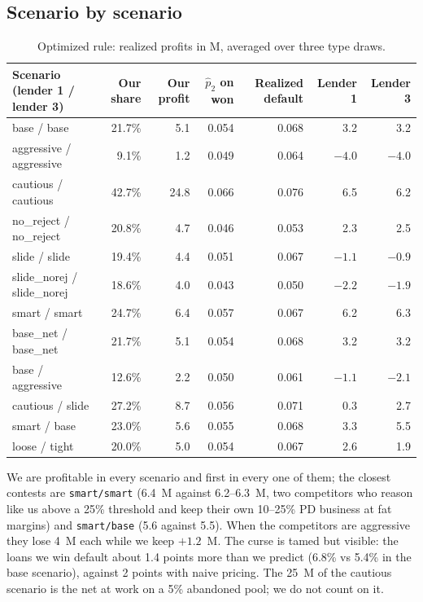 \documentclass[11pt,a4paper]{article}
\newcommand{\meur}{M\texteuro}
\newcommand{\code}[1]{\texttt{#1}}
\begin{document}
\subsection{Scenario by scenario}
\begin{table}[h]\centering\footnotesize
\begin{tabular}{lrrrrrr}
\toprule
Scenario (lender 1 / lender 3) & Our share & Our profit & $\hat p_2$ on won & Realized default & Lender 1 & Lender 3\\
\midrule
base / base                 & 21.7\% &  5.1 & 0.054 & 0.068 &  3.2 &  3.2\\
aggressive / aggressive     &  9.1\% &  1.2 & 0.049 & 0.064 & $-4.0$ & $-4.0$\\
cautious / cautious         & 42.7\% & 24.8 & 0.066 & 0.076 &  6.5 &  6.2\\
no\_reject / no\_reject     & 20.8\% &  4.7 & 0.046 & 0.053 &  2.3 &  2.5\\
slide / slide               & 19.4\% &  4.4 & 0.051 & 0.067 & $-1.1$ & $-0.9$\\
slide\_norej / slide\_norej & 18.6\% &  4.0 & 0.043 & 0.050 & $-2.2$ & $-1.9$\\
smart / smart               & 24.7\% &  6.4 & 0.057 & 0.067 &  6.2 &  6.3\\
base\_net / base\_net       & 21.7\% &  5.1 & 0.054 & 0.068 &  3.2 &  3.2\\
base / aggressive           & 12.6\% &  2.2 & 0.050 & 0.061 & $-1.1$ & $-2.1$\\
cautious / slide            & 27.2\% &  8.7 & 0.056 & 0.071 &  0.3 &  2.7\\
smart / base                & 23.0\% &  5.6 & 0.055 & 0.068 &  3.3 &  5.5\\
loose / tight               & 20.0\% &  5.0 & 0.054 & 0.067 &  2.6 &  1.9\\
\bottomrule
\end{tabular}
\caption{Optimized rule: realized profits in \meur{}, averaged over three type draws.}
\label{tab:scenarios}
\end{table}

We are profitable in every scenario and first in every one of them; the closest contests are \code{smart/smart}
(6.4~\meur{} against 6.2--6.3~\meur{}, two competitors who reason like us above a 25\% threshold and keep their
own 10--25\% PD business at fat margins) and \code{smart/base} (5.6 against 5.5). When the competitors are
aggressive they lose 4~\meur{} each while we keep $+1.2$~\meur{}. The curse is tamed but visible: the loans we win
default about 1.4 points more than we predict (6.8\% vs 5.4\% in the base scenario), against 2 points with naive
pricing. The 25~\meur{} of the cautious scenario is the net at work on a 5\% abandoned pool; we do not count on
it.
\end{document}
